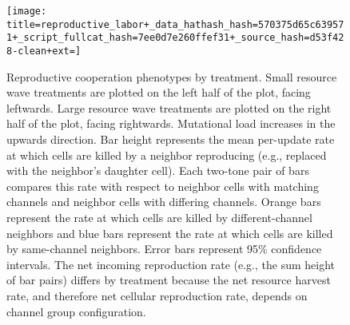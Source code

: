 \begin{figure}[!t]
\begin{center}

\texttt{[image: title=reproductive\_labor+\_data\_hathash\_hash=570375d65c639571+\_script\_fullcat\_hash=7ee0d7e260ffef31+\_source\_hash=d53f428-clean+ext=]}

\caption{
Reproductive cooperation phenotypes by treatment.
Small resource wave treatments are plotted on the left half of the plot, facing leftwards.
Large resource wave treatments are plotted on the right half of the plot, facing rightwards.
Mutational load increases in the upwards direction.
Bar height represents the mean per-update rate at which cells are killed by a neighbor reproducing (e.g., replaced with the neighbor's daughter cell).
Each two-tone pair of bars compares this rate with respect to neighbor cells with matching channels and neighbor cells with differing channels.
Orange bars represent the rate at which cells are killed by different-channel neighbors and blue bars represent the rate at which cells are killed by same-channel neighbors.
Error bars represent 95\% confidence intervals.
The net incoming reproduction rate (e.g., the sum height of bar pairs) differs by treatment because the net resource harvest rate, and therefore net cellular reproduction rate, depends on channel group configuration.
} \label{fig:reproductive_labor}
\end{center}
\end{figure}
